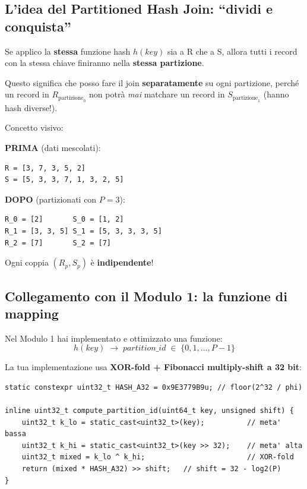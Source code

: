 \documentclass[11pt,a4paper]{article}
\begin{document}
\subsection{L'idea del Partitioned Hash Join: ``dividi e conquista''}

\begin{ideabox}
Se applico la \textbf{stessa} funzione hash $h(\mathit{key})$ sia a R che a S, allora tutti i record con la stessa chiave finiranno nella \textbf{stessa partizione}.

Questo significa che posso fare il join \textbf{separatamente} su ogni partizione, perché un record in $R_{\text{partizione}_0}$ non potrà \emph{mai} matchare un record in $S_{\text{partizione}_1}$ (hanno hash diverse!).
\end{ideabox}

\medskip
Concetto visivo:

\begin{center}
\begin{minipage}[t]{0.42\textwidth}
\textbf{PRIMA} (dati mescolati):
\begin{lstlisting}[style=plain]
R = [3, 7, 3, 5, 2]
S = [5, 3, 3, 7, 1, 3, 2, 5]
\end{lstlisting}
\end{minipage}
\hfill
\begin{minipage}[t]{0.52\textwidth}
\textbf{DOPO} (partizionati con $P=3$):
\begin{lstlisting}[style=plain]
R_0 = [2]       S_0 = [1, 2]
R_1 = [3, 3, 5] S_1 = [5, 3, 3, 3, 5]
R_2 = [7]       S_2 = [7]
\end{lstlisting}
Ogni coppia $(R_p, S_p)$ è \textbf{indipendente}!
\end{minipage}
\end{center}


\subsection{Collegamento con il Modulo 1: la funzione di mapping}

Nel Modulo 1 hai implementato e ottimizzato una funzione:
\[
h(\mathit{key}) \;\rightarrow\; \mathit{partition\_id} \;\in\; \{0, 1, \dots, P{-}1\}
\]

La tua implementazione usa \textbf{XOR-fold + Fibonacci multiply-shift a 32 bit}:

\begin{lstlisting}[style=cpp,caption={Hash function dal Modulo 1}]
static constexpr uint32_t HASH_A32 = 0x9E3779B9u; // floor(2^32 / phi)

inline uint32_t compute_partition_id(uint64_t key, unsigned shift) {
    uint32_t k_lo = static_cast<uint32_t>(key);          // meta' bassa
    uint32_t k_hi = static_cast<uint32_t>(key >> 32);    // meta' alta
    uint32_t mixed = k_lo ^ k_hi;                        // XOR-fold
    return (mixed * HASH_A32) >> shift;   // shift = 32 - log2(P)
}
\end{lstlisting}
\end{document}
